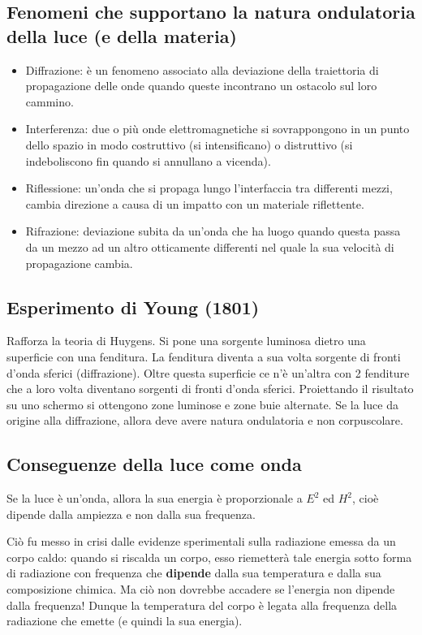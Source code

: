 \subsection{Fenomeni che supportano la natura ondulatoria della luce (e della materia)}
\begin{itemize}
  \item  Diffrazione: è un fenomeno associato alla deviazione della traiettoria di propagazione delle onde quando queste incontrano un ostacolo sul loro cammino.
  \item  Interferenza: due o più onde elettromagnetiche si sovrappongono in un punto dello spazio in modo costruttivo (si intensificano) o distruttivo (si indeboliscono fin quando si annullano a vicenda).
  \item  Riflessione: un'onda che si propaga lungo l'interfaccia tra differenti mezzi, cambia direzione a causa di un impatto con un materiale riflettente.
  \item  Rifrazione: deviazione subita da un'onda che ha luogo quando questa passa da un mezzo ad un altro otticamente differenti nel quale la sua velocità di propagazione cambia.
\end{itemize}
\subsection{Esperimento di Young (1801)}
Rafforza la teoria di Huygens. Si pone una sorgente luminosa dietro una superficie con una fenditura. La fenditura diventa a sua volta sorgente di fronti d'onda sferici (diffrazione). Oltre questa superficie ce n'è un'altra con 2 fenditure che a loro volta diventano sorgenti di fronti d'onda sferici. Proiettando il risultato su uno schermo si ottengono zone luminose e zone buie alternate. Se la luce da origine alla diffrazione, allora deve avere natura ondulatoria e non corpuscolare.

\subsection{Conseguenze della luce come onda}
Se la luce è un'onda, allora la sua energia è proporzionale a $E^2$ ed $H^2$, cioè dipende dalla ampiezza e non dalla sua frequenza. 

Ciò fu messo in crisi dalle evidenze sperimentali sulla radiazione emessa da un corpo caldo: quando si riscalda un corpo, esso riemetterà tale energia sotto forma di radiazione  con frequenza che \textbf{dipende} dalla sua temperatura e dalla sua composizione chimica. Ma ciò non dovrebbe accadere se l'energia non dipende dalla frequenza! Dunque la temperatura del corpo è legata alla frequenza della radiazione che emette (e quindi la sua energia). 

